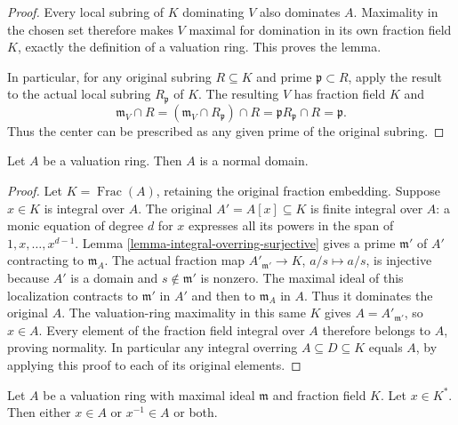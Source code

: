 \begin{proof}
Every local subring of $K$
dominating $V$ also dominates
$A$. Maximality in the chosen
set therefore makes $V$ maximal
for domination in its own
fraction field $K$, exactly
the definition of a valuation
ring. This proves the lemma.

In particular, for any original
subring $R\subseteq K$ and
prime $\mathfrak p\subset R$,
apply the result to the
actual local subring $R_{\mathfrak p}$
of $K$. The resulting $V$
has fraction field $K$ and
$$
\mathfrak m_V\cap R
=(\mathfrak m_V\cap R_{\mathfrak p})\cap R
=\mathfrak pR_{\mathfrak p}\cap R
=\mathfrak p.
$$
Thus the center can be
prescribed as any given
prime of the original subring.
\end{proof}

\begin{lemma}
\label{lemma-valuation-ring-normal}
Let $A$ be a valuation ring.
Then $A$ is a normal domain.
\end{lemma}

\begin{proof}
Let $K=\operatorname{Frac}(A)$, retaining
the original fraction embedding. Suppose
$x\in K$ is integral over $A$.
The original $A'=A[x]\subseteq K$
is finite integral over $A$: a
monic equation of degree $d$ for
$x$ expresses all its powers in
the span of $1,x,\ldots,x^{d-1}$.
Lemma \ref{lemma-integral-overring-surjective}
gives a prime $\mathfrak m'$ of
$A'$ contracting to $\mathfrak m_A$.
The actual fraction map
$A'_{\mathfrak m'}\to K$, $a/s\mapsto a/s$,
is injective because $A'$ is a
domain and $s\notin\mathfrak m'$
is nonzero. The maximal ideal
of this localization contracts to
$\mathfrak m'$ in $A'$ and then
to $\mathfrak m_A$ in $A$.
Thus it dominates the original
$A$. The valuation-ring maximality
in this same $K$ gives
$A=A'_{\mathfrak m'}$, so $x\in A$.
Every element of the fraction field
integral over $A$ therefore belongs
to $A$, proving normality.
In particular any integral overring
$A\subseteq D\subseteq K$ equals
$A$, by applying this proof to
each of its original elements.
\end{proof}


\begin{lemma}
\label{lemma-valuation-ring-x-or-x-inverse}
Let $A$ be a valuation ring with maximal ideal $\mathfrak m$ and
fraction field $K$.
Let $x \in K^*$. Then either $x \in A$ or $x^{-1} \in A$ or both.
\end{lemma}

